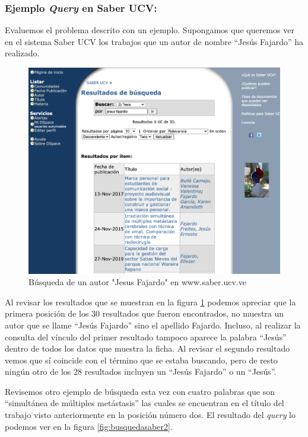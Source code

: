 \documentclass[
  10,
  spanish,
  openany]{book}
\begin{document}
\hypertarget{query}{%
\subsubsection{\texorpdfstring{Ejemplo \textbf{\emph{Query}} en Saber UCV:}{Ejemplo Query en Saber UCV:}}\label{query}}

Evaluemos el problema descrito con un ejemplo. Supongamos que queremos ver en el sistema Saber UCV los trabajos que un autor de nombre ``Jesús Fajardo'' ha realizado.

\begin{figure}

{\centering \includegraphics[width=0.6\linewidth]{images/01-intro/jesus_saber} 

}

\caption{Búsqueda de un autor "Jesus Fajardo" en www.saber.ucv.ve}\label{fig:busquedasaber}
\end{figure}

Al revisar los resultados que se muestran en la figura \ref{fig:busquedasaber} podemos apreciar que la primera posición de los 30 resultados que fueron encontrados, no muestra un autor que se llame ``Jesús Fajardo'' sino el apellido Fajardo. Incluso, al realizar la consulta del vínculo del primer resultado tampoco aparece la palabra ``Jesús'' dentro de todos los datos que muestra la ficha. Al revisar el segundo resultado vemos que sí coincide con el término que se estaba buscando, pero de resto ningún otro de los 28 resultados incluyen un ``Jesús Fajardo'' o un ``Jesús''.

Revisemos otro ejemplo de búsqueda esta vez con cuatro palabras que son ``simultánea de múltiples metástasis'' las cuales se encuentran en el título del trabajo visto anteriormente en la posición número dos. El resultado del \emph{query} lo podemos ver en la figura \ref{fig:busquedasaber2}.
\end{document}
